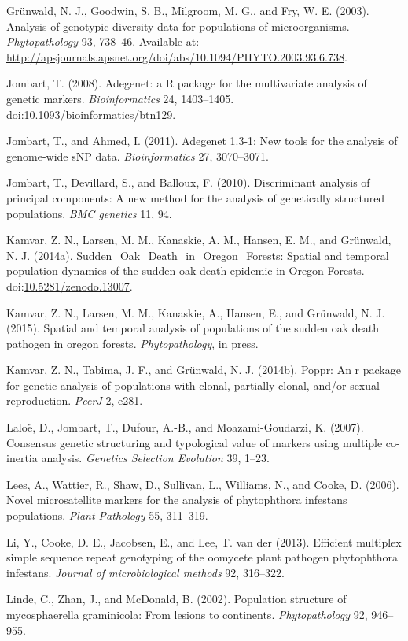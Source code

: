 \documentclass{frontiersSCNS} %
\begin{document}
Grünwald, N. J., Goodwin, S. B., Milgroom, M. G., and Fry, W. E. (2003).
Analysis of genotypic diversity data for populations of microorganisms.
\emph{Phytopathology} 93, 738--46. Available at:
\url{http://apsjournals.apsnet.org/doi/abs/10.1094/PHYTO.2003.93.6.738}.

Jombart, T. (2008). Adegenet: a R package for the multivariate analysis
of genetic markers. \emph{Bioinformatics} 24, 1403--1405.
doi:\href{http://dx.doi.org/10.1093/bioinformatics/btn129}{10.1093/bioinformatics/btn129}.

Jombart, T., and Ahmed, I. (2011). Adegenet 1.3-1: New tools for the
analysis of genome-wide sNP data. \emph{Bioinformatics} 27, 3070--3071.

Jombart, T., Devillard, S., and Balloux, F. (2010). Discriminant
analysis of principal components: A new method for the analysis of
genetically structured populations. \emph{BMC genetics} 11, 94.

Kamvar, Z. N., Larsen, M. M., Kanaskie, A. M., Hansen, E. M., and
Grünwald, N. J. (2014a). Sudden\_Oak\_Death\_in\_Oregon\_Forests:
Spatial and temporal population dynamics of the sudden oak death
epidemic in Oregon Forests.
doi:\href{http://dx.doi.org/10.5281/zenodo.13007}{10.5281/zenodo.13007}.

Kamvar, Z. N., Larsen, M. M., Kanaskie, A., Hansen, E., and Grünwald, N.
J. (2015). Spatial and temporal analysis of populations of the sudden
oak death pathogen in oregon forests. \emph{Phytopathology}, in press.

Kamvar, Z. N., Tabima, J. F., and Gr{ü}nwald, N. J. (2014b). Poppr: An r
package for genetic analysis of populations with clonal, partially
clonal, and/or sexual reproduction. \emph{PeerJ} 2, e281.

Lalo{ë}, D., Jombart, T., Dufour, A.-B., and Moazami-Goudarzi, K.
(2007). Consensus genetic structuring and typological value of markers
using multiple co-inertia analysis. \emph{Genetics Selection Evolution}
39, 1--23.

Lees, A., Wattier, R., Shaw, D., Sullivan, L., Williams, N., and Cooke,
D. (2006). Novel microsatellite markers for the analysis of phytophthora
infestans populations. \emph{Plant Pathology} 55, 311--319.

Li, Y., Cooke, D. E., Jacobsen, E., and Lee, T. van der (2013).
Efficient multiplex simple sequence repeat genotyping of the oomycete
plant pathogen phytophthora infestans. \emph{Journal of microbiological
methods} 92, 316--322.

Linde, C., Zhan, J., and McDonald, B. (2002). Population structure of
mycosphaerella graminicola: From lesions to continents.
\emph{Phytopathology} 92, 946--955.
\end{document}
